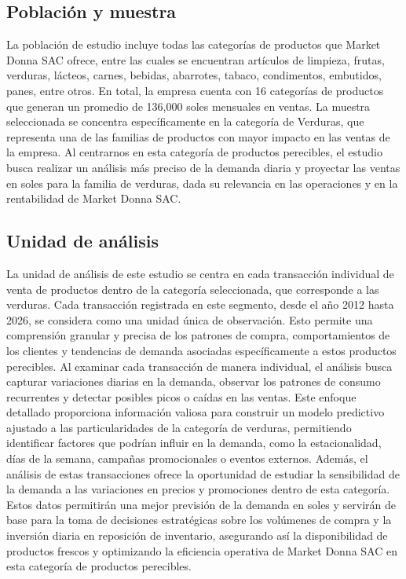 




\subsection{Población y muestra}

La población de estudio incluye todas las categorías de productos que Market Donna SAC ofrece, entre las cuales se encuentran artículos de limpieza, frutas, verduras, lácteos, carnes, bebidas, abarrotes, tabaco, condimentos, embutidos, panes, entre otros. En total, la empresa cuenta con 16 categorías de productos que generan un promedio de 136,000 soles mensuales en ventas.
La muestra seleccionada se concentra específicamente en la categoría de Verduras, que representa una de las familias de productos con mayor impacto en las ventas de la empresa. Al centrarnos en esta categoría de productos perecibles, el estudio busca realizar un análisis más preciso de la demanda diaria y proyectar las ventas en soles para la familia de verduras, dada su relevancia en las operaciones y en la rentabilidad de Market Donna SAC.


\subsection{Unidad de análisis}
La unidad de análisis de este estudio se centra en cada transacción individual de venta de productos dentro de la categoría seleccionada, que corresponde a las verduras. Cada transacción registrada en este segmento, desde el año 2012 hasta 2026, se considera como una unidad única de observación. Esto permite una comprensión granular y precisa de los patrones de compra, comportamientos de los clientes y tendencias de demanda asociadas específicamente a estos productos perecibles.
Al examinar cada transacción de manera individual, el análisis busca capturar variaciones diarias en la demanda, observar los patrones de consumo recurrentes y detectar posibles picos o caídas en las ventas. Este enfoque detallado proporciona información valiosa para construir un modelo predictivo ajustado a las particularidades de la categoría de verduras, permitiendo identificar factores que podrían influir en la demanda, como la estacionalidad, días de la semana, campañas promocionales o eventos externos.
Además, el análisis de estas transacciones ofrece la oportunidad de estudiar la sensibilidad de la demanda a las variaciones en precios y promociones dentro de esta categoría. Estos datos permitirán una mejor previsión de la demanda en soles y servirán de base para la toma de decisiones estratégicas sobre los volúmenes de compra y la inversión diaria en reposición de inventario, asegurando así la disponibilidad de productos frescos y optimizando la eficiencia operativa de Market Donna SAC en esta categoría de productos perecibles.


